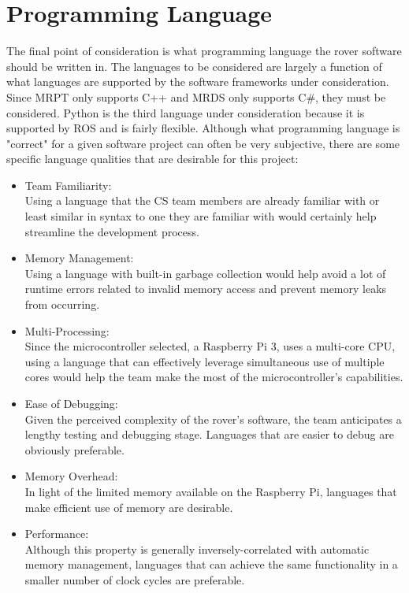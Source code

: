 \documentclass[onecolumn, draftclsnofoot,10pt, compsoc]{IEEEtran}
\begin{document}
\section{Programming Language}
The final point of consideration is what programming language the rover software should be written in. The languages to be considered are largely a function of what languages are supported by the software frameworks under consideration. Since MRPT only supports C++ and MRDS only supports C\#, they must be considered. Python is the third language under consideration because it is supported by ROS and is fairly flexible. Although what programming language is "correct" for a given software project can often be very subjective, there are some specific language qualities that are desirable for this project:
\begin{itemize}
\item Team Familiarity:\\Using a language that the CS team members are already
familiar with or least similar in syntax to one they are familiar with would
certainly help streamline the development process.
\item Memory Management:\\Using a language with built-in garbage collection
would help avoid a lot of runtime errors related to invalid memory access
and prevent memory leaks from occurring.
\item Multi-Processing:\\Since the microcontroller selected, a Raspberry Pi 3, uses
a multi-core CPU, using a language that can effectively leverage simultaneous use of
multiple cores would help the team make the most of the microcontroller's
capabilities.
\item Ease of Debugging:\\Given the perceived complexity of the rover's software,
the team anticipates a lengthy testing and debugging stage. Languages that
are easier to debug are obviously preferable.
\item Memory Overhead:\\In light of the limited memory available on the
Raspberry Pi, languages that make efficient use of memory are desirable.
\item Performance:\\Although this property is generally inversely-correlated with
automatic memory management, languages that can achieve the same
functionality in a smaller number of clock cycles are preferable.
\end{itemize}
\end{document}
